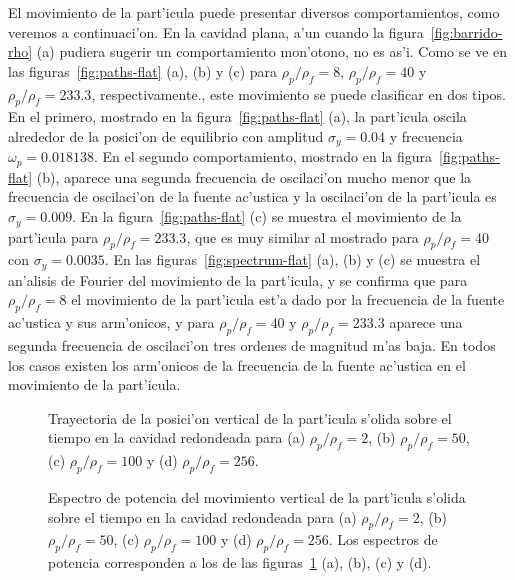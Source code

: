 El movimiento de la part'icula puede presentar diversos comportamientos, como veremos
a continuaci'on. En la cavidad plana, a'un cuando la figura~\ref{fig:barrido-rho} (a) pudiera
sugerir un comportamiento mon'otono, no es as'i. Como se ve en las figuras~\ref{fig:paths-flat} (a),
(b) y (c) para  $\rho_p/\rho_f = 8$,  $\rho_p/\rho_f = 40$ y  $\rho_p/\rho_f = 233.3$, 
respectivamente., este movimiento se puede clasificar en dos tipos. 
En el primero, mostrado en la figura~\ref{fig:paths-flat} (a), la part'icula oscila alrededor de la posici'on de equilibrio
con amplitud $\sigma_y = 0.04$ y frecuencia $\omega_p=0.018138$. En el segundo comportamiento,  mostrado en la
figura~\ref{fig:paths-flat} (b), aparece una segunda frecuencia de oscilaci'on mucho menor que 
la frecuencia de oscilaci'on de la fuente ac'ustica y la oscilaci'on de la part'icula es 
$\sigma_y = 0.009$. En la figura~\ref{fig:paths-flat} (c) se muestra el movimiento de la part'icula 
para $\rho_p/\rho_f = 233.3$, que es muy similar al mostrado para  $\rho_p/\rho_f = 40$ con
$\sigma_y = 0.0035$.  
En las figuras~\ref{fig:spectrum-flat} (a), (b) y (c) se muestra el an'alisis de Fourier 
del movimiento de la part'icula, y se confirma que para   $\rho_p/\rho_f = 8$ 
el movimiento de la part'icula est'a dado por la frecuencia de la fuente ac'ustica y sus arm'onicos, 
y para   $\rho_p/\rho_f = 40$ y  $\rho_p/\rho_f = 233.3$ aparece una segunda frecuencia de oscilaci'on 
tres ordenes de magnitud m'as baja. En todos los casos existen los arm'onicos de la frecuencia de
la fuente ac'ustica en el movimiento de la part'icula.




	
\begin{figure}




\caption{\label{fig:paths-rounded}
Trayectoria de la posici'on vertical de la part'icula s'olida sobre el tiempo en la cavidad redondeada para
(a) $\rho_p/\rho_f = 2$,
(b) $\rho_p/\rho_f = 50$,
(c) $\rho_p/\rho_f = 100$
y
(d) $\rho_p/\rho_f =256$.
}
\end{figure}

\begin{figure}




\caption{\label{fig:spectrum-rounded}
Espectro de potencia del movimiento vertical de la part'icula s'olida sobre el tiempo en la cavidad redondeada para
(a) $\rho_p/\rho_f = 2$,
(b) $\rho_p/\rho_f = 50$,
(c) $\rho_p/\rho_f = 100$
y
(d) $\rho_p/\rho_f =256$.
Los espectros de potencia corresponden a los de las figuras~\ref{fig:paths-rounded} (a), (b), (c) y (d). 
}
\end{figure}

